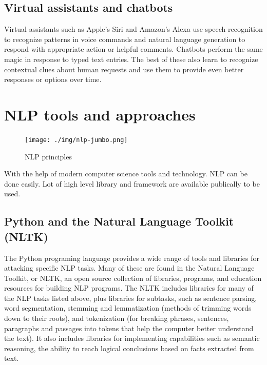 \documentclass[11pt]{article}
\begin{document}
\subsection{Virtual assistants and chatbots}
\label{sec:orgd5c9379}
Virtual assistants such as Apple's Siri and Amazon's Alexa use speech recognition
to recognize patterns in voice commands and natural language generation to respond
with appropriate action or helpful comments. Chatbots perform the same magic in
response to typed text entries. The best of these also learn to recognize contextual
clues about human requests and use them to provide even better responses or options
over time. 
\clearpage

\section{NLP tools and approaches}
\label{sec:org21d6c6e}
\begin{figure}[htbp]
\centering
\texttt{[image: ./img/nlp-jumbo.png]}
\caption{\label{fig:org5be45b6}NLP principles}
\end{figure}     
With the help of modern computer science tools and technology. NLP can be done easily.
Lot of high level library and framework are available publically to be used.

\subsection{Python and the Natural Language Toolkit (NLTK)}
\label{sec:org130ef89}
The Python programing language provides a wide range of tools and libraries
for attacking specific NLP tasks. Many of these are found in the Natural Language
Toolkit, or NLTK, an open source collection of libraries, programs, and
education resources for building NLP programs.
The NLTK includes libraries for many of the NLP tasks listed above, plus libraries
for subtasks, such as sentence parsing, word segmentation, stemming and
lemmatization (methods of trimming words down to their roots), and tokenization
(for breaking phrases, sentences, paragraphs and passages into tokens that help
the computer better understand the text). It also includes libraries for implementing
capabilities such as semantic reasoning, the ability to reach logical conclusions
based on facts extracted from text.
\end{document}
